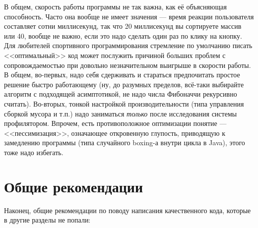 \documentclass{../../text-style}
\begin{document}
В общем, скорость работы программы не так важна, как её объясняющая способность. Часто она вообще не имеет значения --- время реакции пользователя составляет сотни миллисекунд, так что 20 миллисекунд вы сортируете массив или 40, вообще не важно, если это надо сделать один раз по клику на кнопку. Для любителей спортивного программирования стремление по умолчанию писать <<оптимальный>> код может послужить причиной больших проблем с сопровождаемостью при довольно незначительном выигрыше в скорости работы. В общем, во-первых, надо себя сдерживать и стараться предпочитать простое решение быстро работающему (ну, до разумных пределов, всё-таки выбирайте алгоритм с подходящей асимптотикой, не надо числа Фибоначчи рекурсивно считать). Во-вторых, тонкой настройкой производительности (типа управления сборкой мусора и т.п.) надо заниматься \textit{только} после исследования системы профилятором. Впрочем, есть противоположное оптимизации понятие --- <<пессимизация>>, означающее откровенную глупость, приводящую к замедлению программы (типа случайного boxing-а внутри цикла в Java), этого тоже надо избегать.

\section{Общие рекомендации}

Наконец, общие рекомендации по поводу написания качественного кода, которые в другие разделы не попали:
\end{document}
